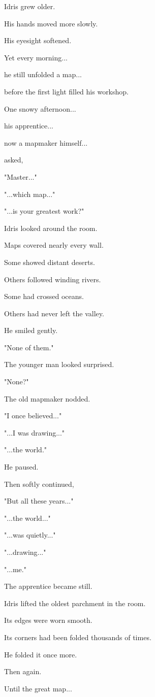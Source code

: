 \documentclass[12pt,openany]{book}
\begin{document}
Idris grew older.

His hands moved more slowly.

His eyesight softened.

Yet every morning...

he still unfolded a map...

before the first light filled his workshop.

One snowy afternoon...

his apprentice...

now a mapmaker himself...

asked,

"Master..."

"...which map..."

"...is your greatest work?"

Idris looked around the room.

Maps covered nearly every wall.

Some showed distant deserts.

Others followed winding rivers.

Some had crossed oceans.

Others had never left the valley.

He smiled gently.

"None of them."

The younger man looked surprised.

"None?"

The old mapmaker nodded.

"I once believed..."

"...I was drawing..."

"...the world."

He paused.

Then softly continued,

"But all these years..."

"...the world..."

"...was quietly..."

"...drawing..."

"...me."

The apprentice became still.

Idris lifted the oldest parchment in the room.

Its edges were worn smooth.

Its corners had been folded thousands of times.

He folded it once more.

Then again.

Until the great map...
\end{document}
